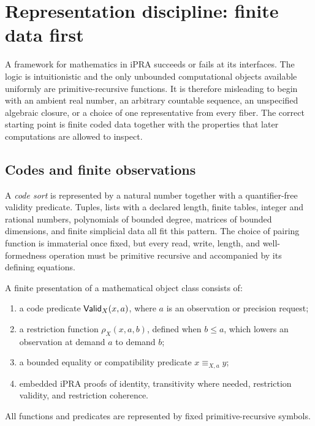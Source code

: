 \section{Representation discipline: finite data first}
\label{sec:representation}

A framework for mathematics in iPRA succeeds or fails at its interfaces.  The
logic is intuitionistic and the only unbounded computational objects available
uniformly are primitive-recursive functions.  It is therefore misleading to
begin with an ambient real number, an arbitrary countable sequence, an
unspecified algebraic closure, or a choice of one representative from every
fiber.  The correct starting point is finite coded data together with the
properties that later computations are allowed to inspect.

\subsection{Codes and finite observations}

A \emph{code sort} is represented by a natural number together with a
quantifier-free validity predicate.  Tuples, lists with a declared length,
finite tables, integer and rational numbers, polynomials of bounded degree,
matrices of bounded dimensions, and finite simplicial data all fit this
pattern.  The choice of pairing function is immaterial once fixed, but every
read, write, length, and well-formedness operation must be primitive recursive
and accompanied by its defining equations.

\begin{definition}
A finite presentation of a mathematical object class consists of:
\begin{enumerate}
\item a code predicate \(\mathsf{Valid}_X(x,a)\), where \(a\) is an observation or
precision request;
\item a restriction function \(\rho_X(x,a,b)\), defined when \(b\leq a\),
which lowers an observation at demand \(a\) to demand \(b\);
\item a bounded equality or compatibility predicate
\(x\equiv_{X,a}y\);
\item embedded iPRA proofs of identity, transitivity where needed,
restriction validity, and restriction coherence.
\end{enumerate}
All functions and predicates are represented by fixed primitive-recursive
symbols.
\end{definition}

